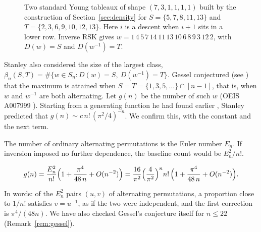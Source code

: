 \documentclass[12pt]{article}
\numberwithin{theorem}{section}
\numberwithin{equation}{section}
\begin{document}
\begin{figure}[ht]
\centering
{}
\caption{Two standard Young tableaux of shape $(7,3,1,1,1,1)$ built by the construction of
Section~\ref{sec:density} for $S=\{5,7,8,11,13\}$ and $T=\{2,3,6,9,10,12,13\}$. Here $i$ is a descent when
$i+1$ sits in a lower row. Inverse RSK gives $w=1\,4\,5\,7\,14\,11\,13\,10\,6\,8\,9\,3\,12\,2$, with
$D(w)=S$ and $D(w^{-1})=T$.}
\label{fig:example}
\end{figure}

Stanley also considered the size of the largest class, $\beta_n(S,T)=\#\{w\in S_n: D(w)=S,\ D(w^{-1})=T\}$.
Gessel conjectured (see \cite{stanleyMO}) that the maximum is attained when $S=T=\{1,3,5,\dots\}\cap[n-1]$,
that is, when $w$ and $w^{-1}$ are both alternating. Let $g(n)$ be the number of such $w$ (OEIS A007999
\cite{oeisA007999}). Starting from a generating function he had found earlier \cite{stanleyAlt}, Stanley
predicted \cite{stanleyMO} that $g(n)\sim c\,n!\,(\pi^2/4)^{-n}$. We confirm this, with the constant and the
next term.

The number of ordinary alternating permutations is the Euler number $E_n$. If inversion imposed no further dependence, the baseline count would be $E_n^2/n!$.

\begin{theorem}\label{thm:alt}
\[
g(n)=\frac{E_n^2}{n!}\Bigl(1+\frac{\pi^4}{48\,n}+O(n^{-2})\Bigr)
=\frac{16}{\pi^2}\Bigl(\frac{4}{\pi^2}\Bigr)^{n}n!\,\Bigl(1+\frac{\pi^4}{48\,n}+O(n^{-2})\Bigr).
\]
\end{theorem}

In words: of the $E_n^2$ pairs $(u,v)$ of alternating permutations, a proportion close to $1/n!$ satisfies
$v=u^{-1}$, as if the two were independent, and the first correction is $\pi^4/(48n)$. We have also checked
Gessel's conjecture itself for $n\le22$ (Remark~\ref{rem:gessel}).
\end{document}
